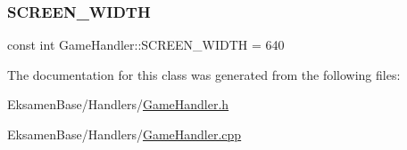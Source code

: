 \subsubsection{\texorpdfstring{S\+C\+R\+E\+E\+N\+\_\+\+W\+I\+D\+TH}{SCREEN\_WIDTH}}
{\footnotesize\ttfamily const int Game\+Handler\+::\+S\+C\+R\+E\+E\+N\+\_\+\+W\+I\+D\+TH = 640\hspace{0.3cm}{\ttfamily [static]}}



The documentation for this class was generated from the following files\+:\begin{DoxyCompactItemize}
\item 
Eksamen\+Base/\+Handlers/\mbox{\hyperlink{_game_handler_8h}{Game\+Handler.\+h}}\item 
Eksamen\+Base/\+Handlers/\mbox{\hyperlink{_game_handler_8cpp}{Game\+Handler.\+cpp}}\end{DoxyCompactItemize}
